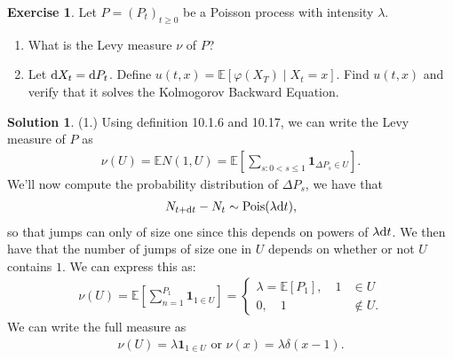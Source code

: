 \documentclass[12pt]{article}
\newcommand{\Expect}{\mathbb{E}}
\renewcommand{\phi}{\varphi}
\theoremstyle{definition}
\newtheorem{exer}{Exercise}
\newtheorem{sol}{Solution}
\theoremstyle{remark}
\def\d{{\rm d}}
\begin{document}
\newpage

\begin{exer}
    Let $P = (P_{t})_{t\geq 0}$ be a Poisson process with intensity $\lambda$.
    \begin{enumerate}
        \item What is the Levy measure $\nu$ of $P$?
        \item Let  $\d X_{t} = \d P_{t}$. Define $u(t,x) = \Expect[\phi(X_{T})\mid X_{t} = x]$. Find $u(t,x)$ and verify that it solves the Kolmogorov Backward Equation.
    \end{enumerate}
\end{exer}

\begin{sol}
    (1.) Using definition 10.1.6 and 10.17, we can write the Levy measure of $P$ as 
     \begin{align*}
         \nu(U) = \Expect N(1, U) = \Expect\left[ \sum_{s: 0 < s \leq 1} \mathbf{1}_{\Delta P_{s} \in U}   \right].
    \end{align*}
    We'll now compute the probability distribution of $\Delta P_{s}$, we have that
    \begin{align*}
        N_{t + \d t} - N_{t} \sim \text{Pois}(\lambda \d t),
    \end{align*}
    so that jumps can only of size one since this depends on powers of $\lambda \d t$. We then have that the number of jumps of size one in $U$ depends on whether or not $U$ contains $1$. We can express this as: 
    \begin{align*}
    \nu(U) = \Expect \left[ \sum_{n=1}^{P_{1}} \mathbf{1}_{1 \in U} \right] = \begin{cases}
        \lambda = \Expect \left[ P_{1} \right], \quad 1 &\in U \\
        0, \quad 1 &\not\in U.
    \end{cases}
\end{align*}
We can write the full measure as
    \begin{align*}
        \nu(U)= \lambda \mathbf{1}_{1 \in U} \text{ or } \nu(x) = \lambda \delta(x - 1).
    \end{align*}


\end{sol}
\end{document}
